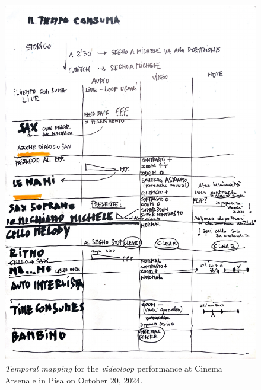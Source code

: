 \begin{figure}
    \centering
    \includegraphics[width=\linewidth]{chapters/appendix/a/image/figa-data-temporal02.pdf}
    \caption{\textit{Temporal mapping} for the \textit{videoloop} performance at Cinema Arsenale in Pisa on October 20, 2024.}
    \label{fig:aa-mapping-temporal-02}
\end{figure}

